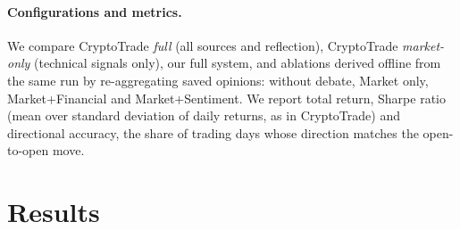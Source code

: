 \documentclass[11pt]{article}
\begin{document}
\paragraph{Configurations and metrics.}
We compare CryptoTrade \emph{full} (all sources and reflection), CryptoTrade \emph{market-only} (technical signals
only), our full system, and ablations derived offline from the same run by re-aggregating saved opinions: without
debate, Market only, Market+Financial and Market+Sentiment. We report total return, Sharpe ratio~\citep{sharpe1966}
(mean over standard deviation of daily returns, as in CryptoTrade) and directional accuracy, the share of trading days
whose direction matches the open-to-open move.

\section{Results}

\begin{table}[t]
\centering
\small
\setlength{\tabcolsep}{3.5pt}
\caption{Total return (\%) on the three BTC periods with the same local LLM.}
\label{tab:main}
\end{table}
\end{document}
